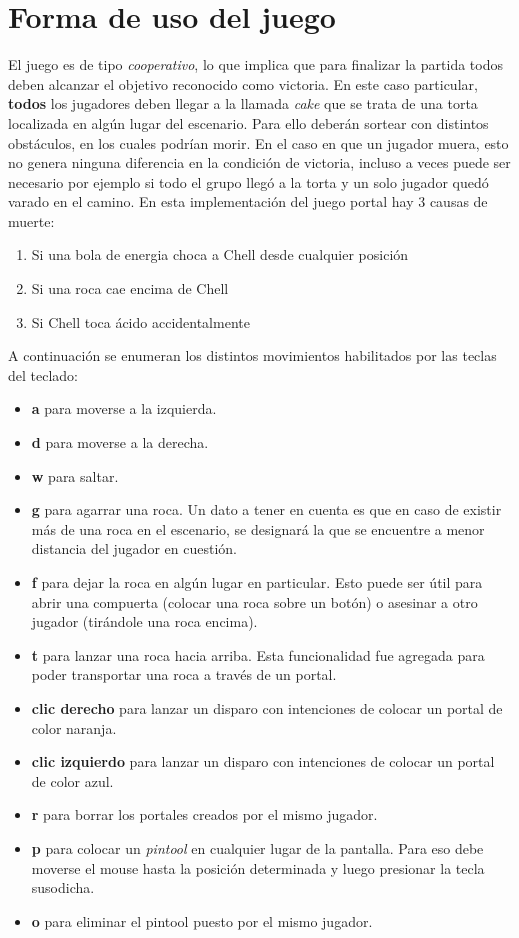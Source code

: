 \documentclass[a4paper]{article}
\begin{document}
\section{Forma de uso del juego}
El juego es de tipo \textit{cooperativo}, lo que implica que para finalizar la partida todos deben alcanzar el objetivo reconocido como victoria. En este caso particular, \textbf{todos} los jugadores deben llegar a la llamada \textit{cake} que se trata de una torta localizada en algún lugar del escenario. Para ello deberán sortear con distintos obstáculos, en los cuales podrían morir. En el caso en que un jugador muera, esto no genera ninguna diferencia en la condición de victoria, incluso a veces puede ser necesario por ejemplo si todo el grupo llegó a la torta y un solo jugador quedó varado en el camino. En esta implementación del juego portal hay 3 causas de muerte:
\begin{enumerate}
	\item Si una bola de energia choca a Chell desde cualquier posición
	\item Si una roca cae encima de Chell
	\item Si Chell toca ácido accidentalmente
\end{enumerate}

A continuación se enumeran los distintos movimientos habilitados por las teclas del teclado:
\begin{itemize}
	\item \textbf{a} para moverse a la izquierda.
	\item \textbf{d} para moverse a la derecha.
	\item \textbf{w} para saltar.
	\item \textbf{g} para agarrar una roca. Un dato a tener en cuenta es que en caso de existir más de una roca en el escenario, se designará la que se encuentre a menor distancia del jugador en cuestión.
	\item \textbf{f} para dejar la roca en algún lugar en particular. Esto puede ser útil para abrir una compuerta (colocar una roca sobre un botón) o asesinar a otro jugador (tirándole una roca encima).
	\item \textbf{t} para lanzar una roca hacia arriba. Esta funcionalidad fue agregada para poder transportar una roca a través de un portal.
	\item \textbf{clic derecho} para lanzar un disparo con intenciones de colocar un portal de color naranja. 
	\item \textbf{clic izquierdo} para lanzar un disparo con intenciones de colocar un portal de color azul. 
	\item \textbf{r} para borrar los portales creados por el mismo jugador.
	\item \textbf{p} para colocar un \textit{pintool} en cualquier lugar de la pantalla. Para eso debe moverse el mouse hasta la posición determinada y luego presionar la tecla susodicha.
	\item \textbf{o} para eliminar el pintool puesto por el mismo jugador.
\end{itemize}
\end{document}
